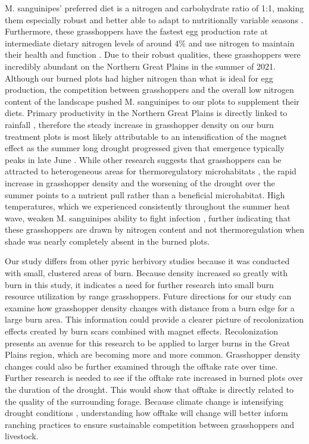 \documentclass[referee, 
	            sn-basic]
           {sn-jnl}
\begin{document}
\begin{linenumbers}
M. sanguinipes' preferred diet is a nitrogen and carbohydrate ratio of
1:1, making them especially robust and better able to adapt to
nutritionally variable seasons \citep{behmer2008}. Furthermore, these
grasshoppers have the fastest egg production rate at intermediate
dietary nitrogen levels of around 4\% \citep{joern1998} and use nitrogen
to maintain their health and function \citep{schmitz2010}. Due to their
robust qualities, these grasshoppers were incredibly abundant on the
Northern Great Plains in the summer of 2021. Although our burned plots
had higher nitrogen than what is ideal for egg production, the
competition between grasshoppers and the overall low nitrogen content of
the landscape pushed M. sanguinipes to our plots to supplement their
diets. Primary productivity in the Northern Great Plains is directly
linked to rainfall \citep{padbury2002}, therefore the steady increase in
grasshopper density on our burn treatment plots is most likely
attributable to an intensification of the magnet effect as the summer
long drought progressed given that emergence typically peaks in late
June \citep{belovsky1995, humphreys2022}. While other research suggests
that grasshoppers can be attracted to heterogeneous areas for
thermoregulatory microhabitats \citep{joern2013}, the rapid increase in
grasshopper density and the worsening of the drought over the summer
points to a nutrient pull rather than a beneficial microhabitat. High
temperatures, which we experienced consistently throughout the summer
heat wave, weaken M. sanguinipes ability to fight infection
\citep{srygley2022}, further indicating that these grasshoppers are
drawn by nitrogen content and not thermoregulation when shade was nearly
completely absent in the burned plots.

Our study differs from other pyric herbivory studies because it was
conducted with small, clustered areas of burn. Because density increased
so greatly with burn in this study, it indicates a need for further
research into small burn resource utilization by range grasshoppers.
Future directions for our study can examine how grasshopper density
changes with distance from a burn edge for a large burn area. This
information could provide a clearer picture of recolonization effects
created by burn scars combined with magnet effects. Recolonization
presents an avenue for this research to be applied to larger burns in
the Great Plains region, which are becoming more and more common.
Grasshopper density changes could also be further examined through the
offtake rate over time. Further research is needed to see if the offtake
rate increased in burned plots over the duration of the drought. This
would show that offtake is directly related to the quality of the
surrounding forage. Because climate change is intensifying drought
conditions \citep{derner2018}, understanding how offtake will change
will better inform ranching practices to ensure sustainable competition
between grasshoppers and livestock.


\end{linenumbers}
\end{document}
